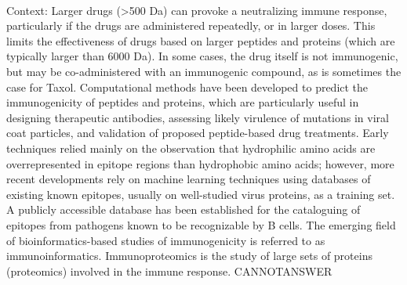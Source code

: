 \documentclass[11pt,a4paper, onecolumn]{article}
\begin{document}
\\ Context: Larger drugs (>500 Da) can provoke a neutralizing immune response, particularly if the drugs are administered repeatedly, or in larger doses. This limits the effectiveness of drugs based on larger peptides and proteins (which are typically larger than 6000 Da). In some cases, the drug itself is not immunogenic, but may be co-administered with an immunogenic compound, as is sometimes the case for Taxol. Computational methods have been developed to predict the immunogenicity of peptides and proteins, which are particularly useful in designing therapeutic antibodies, assessing likely virulence of mutations in viral coat particles, and validation of proposed peptide-based drug treatments. Early techniques relied mainly on the observation that hydrophilic amino acids are overrepresented in epitope regions than hydrophobic amino acids; however, more recent developments rely on machine learning techniques using databases of existing known epitopes, usually on well-studied virus proteins, as a training set. A publicly accessible database has been established for the cataloguing of epitopes from pathogens known to be recognizable by B cells. The emerging field of bioinformatics-based studies of immunogenicity is referred to as immunoinformatics. Immunoproteomics is the study of large sets of proteins (proteomics) involved in the immune response. CANNOTANSWER
\end{document}
